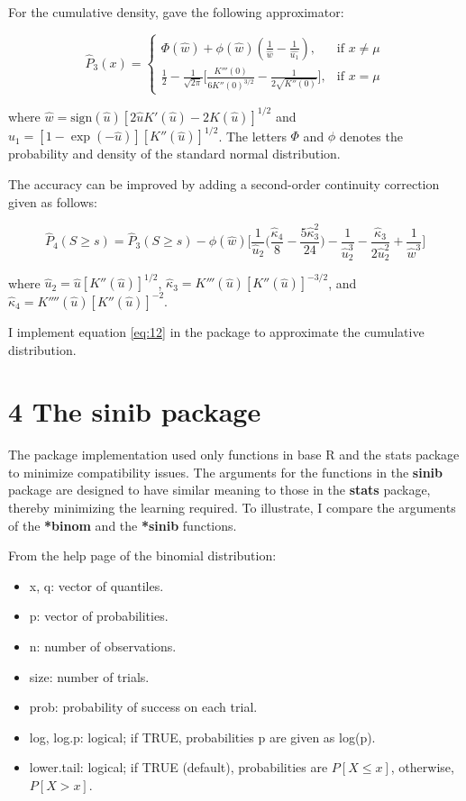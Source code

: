 For the cumulative density, \cite{Anonymous:0hq1uBaf} gave the following approximator: 

\begin{equation}
\hat{P}_3(x)=
\begin{cases}
\Phi(\hat{w})+\phi(\hat{w}) (\frac{1}{\hat{w}} - \frac{1}{\hat{u_1}}), & \text{if } x \neq \mu \\
\frac{1}{2} - \frac{1}{\sqrt{2 \pi}} \big[\frac{K'''(0)}{6 K''(0)^{3/2}} - \frac{1}{2 \sqrt{K''(0)}} \big], & \text{if } x = \mu
\end{cases}
\end{equation}

where $\hat{w}= \text{sign}(\hat{u}) [2 \hat{u} K'(\hat{u}) - 2K(\hat{u})]^{1/2}$ and $u_1=[1-\exp(-\hat{u})][K''(\hat{u})]^{1/2}$. The letters $\Phi$ and $\phi$ denotes the probability and density of the standard normal distribution. 

The accuracy can be improved by adding a second-order continuity correction given as follows:

\begin{equation}
\hat{P}_4(S \geq s)=\hat{P}_3(S \geq s) - \phi(\hat{w}) \Big [ \frac{1}{\hat{u}_2} \Big ( \frac{\hat{\kappa}_4}{8} - \frac{5 \hat{\kappa}^2_3}{24} \Big ) - \frac{1}{\hat{u}_2^3} - \frac{\hat{\kappa}_3}{2 \hat{u}_2^2} + \frac{1}{\hat{w}^3} \Big]
\label{eq:12}
\end{equation}

where $\hat{u}_2=\hat{u}[K''(\hat{u})]^{1/2}$, $\hat{\kappa}_3=K'''(\hat{u}) [K''(\hat{u})]^{-3/2}$, and $\hat{\kappa}_4 = K''''(\hat{u}) [K''(\hat{u})]^{-2}$.

I implement equation \ref{eq:12} in the package to approximate the cumulative distribution. 

\section{4 The \textbf{sinib} package}

The package implementation used only functions in base R and the stats package to minimize compatibility issues. The arguments for the functions in the \textbf{sinib} package are designed to have similar meaning to those in the \textbf{stats} package, thereby minimizing the learning required. To illustrate, I compare the arguments of the \textbf{*binom} and the \textbf{*sinib} functions. 

From the help page of the binomial distribution: 

\begin{itemize}
\item x, q: vector of quantiles.
\item p: vector of probabilities.
\item n: number of observations. 
\item size: number of trials. 
\item prob: probability of success on each trial.
\item log, log.p: logical; if TRUE, probabilities p are given as log(p). 
\item lower.tail: logical; if TRUE (default), probabilities are $P[X \leq x]$, otherwise, $P[X > x]$. 
\end{itemize}

